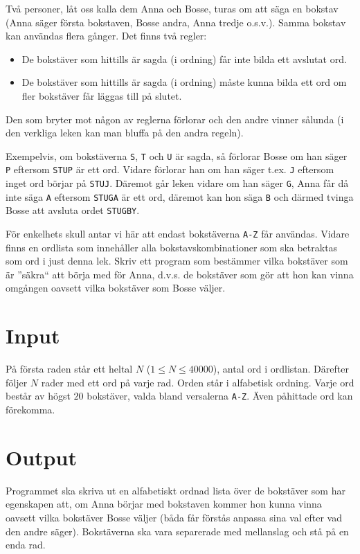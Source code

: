 Två personer, låt oss kalla dem Anna och Bosse, turas om att säga en bokstav (Anna säger första bokstaven, Bosse andra, Anna tredje o.s.v.). Samma bokstav kan användas flera gånger. Det finns två regler:

\begin{itemize}
	\item De bokstäver som hittills är sagda (i ordning) får inte bilda ett avslutat ord.
	\item De bokstäver som hittills är sagda (i ordning) måste kunna bilda ett ord om fler bokstäver får läggas till på slutet.
\end{itemize}

Den som bryter mot någon av reglerna förlorar och den andre vinner sålunda (i den verkliga leken kan man bluffa på den andra regeln).

Exempelvis, om bokstäverna \texttt{S}, \texttt{T} och \texttt{U} är sagda, så förlorar Bosse om han säger \texttt{P} eftersom \texttt{STUP} är ett ord. Vidare förlorar han om han säger t.ex. \texttt{J} eftersom inget ord börjar på \texttt{STUJ}. Däremot går leken vidare om han säger \texttt{G}, Anna får då inte säga \texttt{A} eftersom \texttt{STUGA} är ett ord, däremot kan hon säga \texttt{B} och därmed tvinga Bosse att avsluta ordet \texttt{STUGBY}.

För enkelhets skull antar vi här att endast bokstäverna \texttt{A-Z} får användas. Vidare finns en ordlista som innehåller alla bokstavskombinationer som ska betraktas som ord i just denna lek. Skriv ett program som bestämmer vilka bokstäver som är ''säkra`` att börja med för Anna, d.v.s. de bokstäver som gör att hon kan vinna omgången oavsett vilka bokstäver som Bosse väljer.

\section*{Input}
På första raden står ett heltal $N$ ($1 \leq N \leq 40000$), antal ord i ordlistan. Därefter följer $N$ rader med ett ord på varje rad. Orden står i alfabetisk ordning. Varje ord består av högst $20$ bokstäver, valda bland versalerna \texttt{A-Z}. Även påhittade ord kan förekomma.

\section*{Output}
Programmet ska skriva ut en alfabetiskt ordnad lista över de bokstäver som har egenskapen att, om Anna börjar med bokstaven kommer hon kunna vinna oavsett vilka bokstäver Bosse väljer (båda får förstås anpassa sina val efter vad den andre säger). Bokstäverna ska vara separerade med mellanslag och stå på en enda rad.

